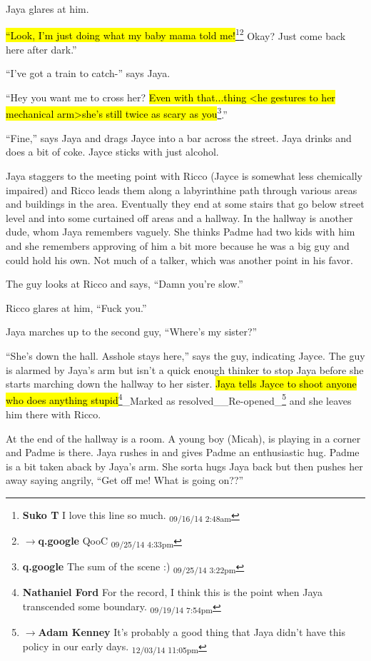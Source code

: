 Jaya glares at him.

\hl{``Look, I'm just doing what my baby mama told me!}\footnote{\textbf{Suko T }I love this line so much. \textsubscript{09/16/14 2:48am}}\footnote{$\rightarrow$\textbf{q.google }QooC \textsubscript{09/25/14 4:33pm}}  Okay?  Just come back here after dark.''

``I've got a train to catch-'' says Jaya.

``Hey you want me to cross her?  \hl{Even with that...thing \textless he gestures to her mechanical arm\textgreater  she's still twice as scary as you}\footnote{\textbf{q.google }The sum of the scene :) \textsubscript{09/25/14 3:22pm}}.''

``Fine,'' says Jaya and drags Jayce into a bar across the street.  Jaya drinks and does a bit of coke.  Jayce sticks with just alcohol.



Jaya staggers to the meeting point with Ricco (Jayce is somewhat less chemically impaired) and Ricco leads them along a labyrinthine path through various areas and buildings in the area.  Eventually they end at some stairs that go below street level and into some curtained off areas and a hallway.  In the hallway is another dude, whom Jaya remembers vaguely.  She thinks Padme had two kids with him and she remembers approving of him a bit more because he was a big guy and could hold his own. Not much of a talker, which was another point in his favor.

The guy looks at Ricco and says, ``Damn you're slow.''

Ricco glares at him, ``Fuck you.''

Jaya marches up to the second guy, ``Where's my sister?''

``She's down the hall.  Asshole stays here,'' says the guy, indicating Jayce.  The guy is alarmed by Jaya's arm but isn't a quick enough thinker to stop Jaya before she starts marching down the hallway to her sister.  \hl{Jaya tells Jayce to shoot anyone who does anything stupid}\footnote{\textbf{Nathaniel Ford }For the record, I think this is the point when Jaya transcended some boundary. \textsubscript{09/19/14 7:54pm}}\_Marked as resolved\_\_Re-opened\_\footnote{$\rightarrow$\textbf{Adam Kenney }It's probably a good thing that Jaya didn't have this policy in our early days. \textsubscript{12/03/14 11:05pm}} and she leaves him there with Ricco.



At the end of the hallway is a room.  A young boy (Micah), is playing in a corner and Padme is there.  Jaya rushes in and gives Padme an enthusiastic hug.  Padme is a bit taken aback by Jaya's arm.  She sorta hugs Jaya back but then pushes her away saying angrily, ``Get off me!  What is going on??''

